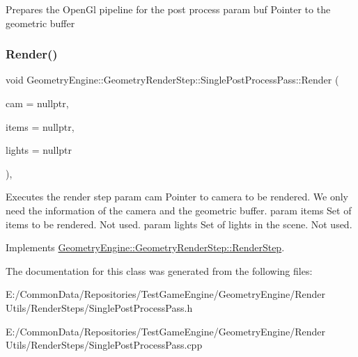 Prepares the Open\+Gl pipeline for the post process param buf Pointer to the geometric buffer \mbox{\label{class_geometry_engine_1_1_geometry_render_step_1_1_single_post_process_pass_abb6e6e69af639e0c1bd8b1ec7c73a44c}} 
\subsubsection{\texorpdfstring{Render()}{Render()}}
{\footnotesize\ttfamily void Geometry\+Engine\+::\+Geometry\+Render\+Step\+::\+Single\+Post\+Process\+Pass\+::\+Render (\begin{DoxyParamCaption}\item[{\mbox{\hyperlink{class_geometry_engine_1_1_geometry_world_item_1_1_geometry_camera_1_1_camera}{Geometry\+World\+Item\+::\+Geometry\+Camera\+::\+Camera}} $\ast$}]{cam = {\ttfamily nullptr},  }\item[{std\+::unordered\+\_\+set$<$ \mbox{\hyperlink{class_geometry_engine_1_1_geometry_world_item_1_1_geometry_item_1_1_geometry_item}{Geometry\+World\+Item\+::\+Geometry\+Item\+::\+Geometry\+Item}} $\ast$ $>$ $\ast$}]{items = {\ttfamily nullptr},  }\item[{std\+::unordered\+\_\+set$<$ \mbox{\hyperlink{class_geometry_engine_1_1_geometry_world_item_1_1_geometry_light_1_1_light}{Geometry\+World\+Item\+::\+Geometry\+Light\+::\+Light}} $\ast$ $>$ $\ast$}]{lights = {\ttfamily nullptr} }\end{DoxyParamCaption})\hspace{0.3cm}{\ttfamily [override]}, {\ttfamily [virtual]}}

Executes the render step param cam Pointer to camera to be rendered. We only need the information of the camera and the geometric buffer. param items Set of items to be rendered. Not used. param lights Set of lights in the scene. Not used. 

Implements \mbox{\hyperlink{class_geometry_engine_1_1_geometry_render_step_1_1_render_step_a9b054ee8f38304319a9d03ba3e173dcd}{Geometry\+Engine\+::\+Geometry\+Render\+Step\+::\+Render\+Step}}.



The documentation for this class was generated from the following files\+:\begin{DoxyCompactItemize}
\item 
E\+:/\+Common\+Data/\+Repositories/\+Test\+Game\+Engine/\+Geometry\+Engine/\+Render Utils/\+Render\+Steps/Single\+Post\+Process\+Pass.\+h\item 
E\+:/\+Common\+Data/\+Repositories/\+Test\+Game\+Engine/\+Geometry\+Engine/\+Render Utils/\+Render\+Steps/Single\+Post\+Process\+Pass.\+cpp\end{DoxyCompactItemize}

